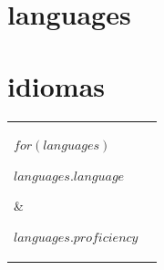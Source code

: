 \documentclass[letterpaper,12pt]{article}
\newcommand{\lightfont}[1]{{%
    {\hlight\color{light-gray}#1}
  }}
\newcommand{\pubstyle}[1]{{%
    {\fontsize{10pt}{13pt}\hlight\color{light-gray}#1}
  }}
\newcommand{\lightbf}[1]{{%
    \textbf{\lightfont{#1}}
  }}
\newcommand{\emphasized}[1]{{%
    {\fontsize{14pt}{18pt}\textbf{#1}}
  }}
\begin{document}
\begin{minipage}[t]{0.64\textwidth}
      {\section{languages}}
      {\section{idiomas}}%
  \setlength{\parskip}{1mm}
  \setlength{\hwide}{\dimexpr.5\hsize-4\tabcolsep}
  \setlength{\hwideright}{\dimexpr\hwide+5\tabcolsep}

  \begin{tabular}{@{}p{\hwide}p{\rightwide}}
    $for(languages)$
      \parbox[t][][t]{\hwide}{%
        \emphasized{$languages.language$}
        \medskip
      } & %
      \parbox[t][][t]{\rightwide}{%
        \lightbf{$languages.proficiency$}
        \medskip
      } \\ %
    $endfor$
  \end{tabular}
%
%  
%  
\end{minipage}
\end{document}
